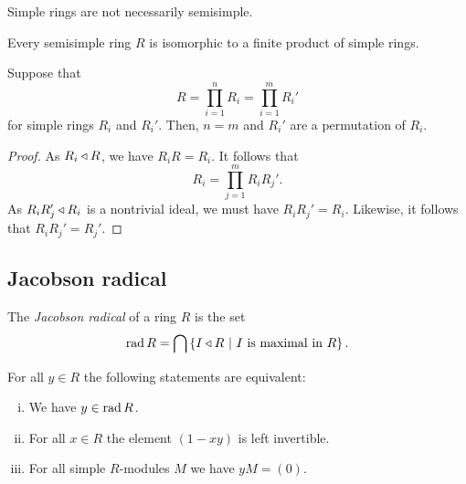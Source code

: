 \begin{opomba}
Simple rings are not necessarily semisimple.
\end{opomba}

\begin{opomba}
Every semisimple ring $R$ is isomorphic to a finite product of
simple rings.
\end{opomba}

\begin{trditev}
Suppose that
\[
R = \prod_{i=1}^n R_i = \prod_{i=1}^m R_i'
\]
for simple rings $R_i$ and $R_i'$. Then, $n = m$ and $R_i'$ are a
permutation of $R_i$.
\end{trditev}

\begin{proof}
As $R_i \triangleleft R$, we have $R_i R = R_i$. It follows that
\[
R_i = \prod_{j=1}^m R_i R_j'.
\]
As $R_i R_j' \triangleleft R_i$ is a nontrivial ideal, we must have
$R_i R_j' = R_i$. Likewise, it follows that $R_i R_j' = R_j'$.
\end{proof}

\newpage

\subsection{Jacobson radical}

\begin{definicija}
The \emph{Jacobson radical} of a ring $R$
is the set
\[
\operatorname{rad} R = \bigcap \left\{I \triangleleft R~\middle\vert~\text{$I$ is maximal in $R$}\right\}.
\]
\end{definicija}

\begin{lema}
\label{fin_dim_alg:lm:jac_rad}
For all $y \in R$ the following statements are equivalent:

\begin{enumerate}[i)]
\item We have $y \in \operatorname{rad} R$.
\item For all $x \in R$ the element $(1-xy)$ is left invertible.
\item For all simple $R$-modules $M$ we have $yM = (0)$.
\end{enumerate}
\end{lema}

